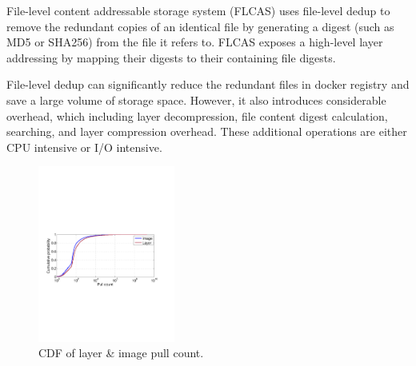 File-level content addressable storage system (FLCAS) uses file-level dedup to remove the redundant copies of an identical file by generating a digest (such as MD5 or SHA256) from the file it refers to.
%
%
FLCAS exposes a high-level layer addressing by mapping their digests to their containing file digests.     
%
%
%

File-level dedup can significantly reduce the redundant files in docker registry and save a large volume of storage space. However, it also introduces considerable overhead, which including layer decompression, file content digest calculation, searching, and layer compression overhead. These additional operations are either CPU intensive or I/O intensive.  

\begin{figure}
	\centering
	\includegraphics[width=0.4\textwidth]{graphs/pull-cnt.pdf}
	\caption{CDF of layer \& image pull count.
	}
	\label{fig:pull-cnt}
\end{figure}

